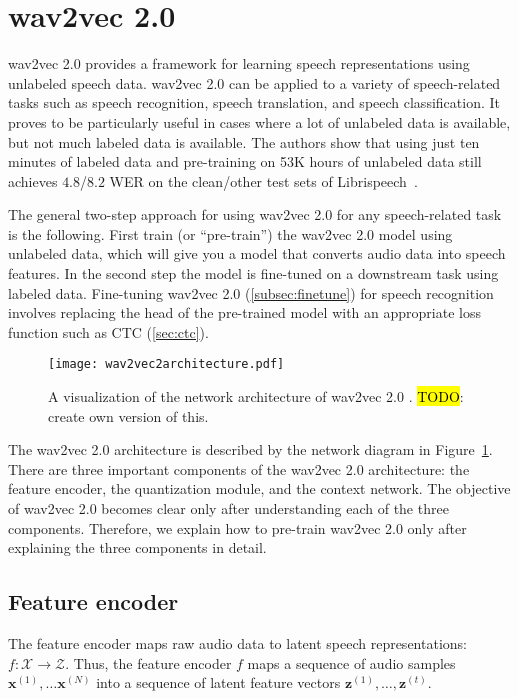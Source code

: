\newpage
\section{wav2vec 2.0}
wav2vec 2.0 provides a framework for learning speech representations using unlabeled speech data.
wav2vec 2.0 can be applied to a variety of speech-related tasks such as speech recognition, speech translation,
and speech classification.
It proves to be particularly useful in cases where a lot of unlabeled data is available, but not much labeled data is available.
The authors show that using just ten minutes of labeled data and pre-training
on 53K hours of unlabeled data still achieves $4.8$/$8.2$ WER on the clean/other test sets of Librispeech~\cite{panayotov2015librispeech}.

The general two-step approach for using wav2vec 2.0 for any speech-related task is the following.
First train (or ``pre-train'') the wav2vec 2.0 model using unlabeled data, which
will give you a model that converts audio data into speech features.
In the second step the model is fine-tuned on a downstream task using labeled data. 
Fine-tuning wav2vec 2.0 (\ref{subsec:finetune}) for speech recognition involves replacing the head of the 
pre-trained model with an appropriate loss function such as CTC (\ref{sec:ctc}).

\begin{figure}[h!]
    \centering
    \captionsetup{justification=centering}
    \texttt{[image: wav2vec2architecture.pdf]}
    \caption{A visualization of the network architecture of wav2vec 2.0 \cite{baevski2020wav2vec}. \hl{TODO}: create own version of this.}
    \label{fig:wav2vec2_architecture}
\end{figure}

The wav2vec 2.0 architecture is described by the network diagram in Figure~\ref{fig:wav2vec2_architecture}.
There are three important components of the wav2vec 2.0 architecture:
the feature encoder, the quantization module, and the context network.
The objective of wav2vec 2.0 becomes clear only after understanding each of the three
components. Therefore, we explain how to pre-train wav2vec 2.0 only after explaining
the three components in detail.

\newpage
\subsection{Feature encoder}
The feature encoder maps raw audio data to latent speech representations: $f: \mathcal{X} \rightarrow \mathcal{Z}$.
Thus, the feature encoder $f$ maps a sequence of audio samples $\mathbf{x}^{(1)}, \dots \mathbf{x}^{(N)}$ into a sequence of latent feature vectors $\mathbf{z}^{(1)}, \dots, \mathbf{z}^{(t)}$.


